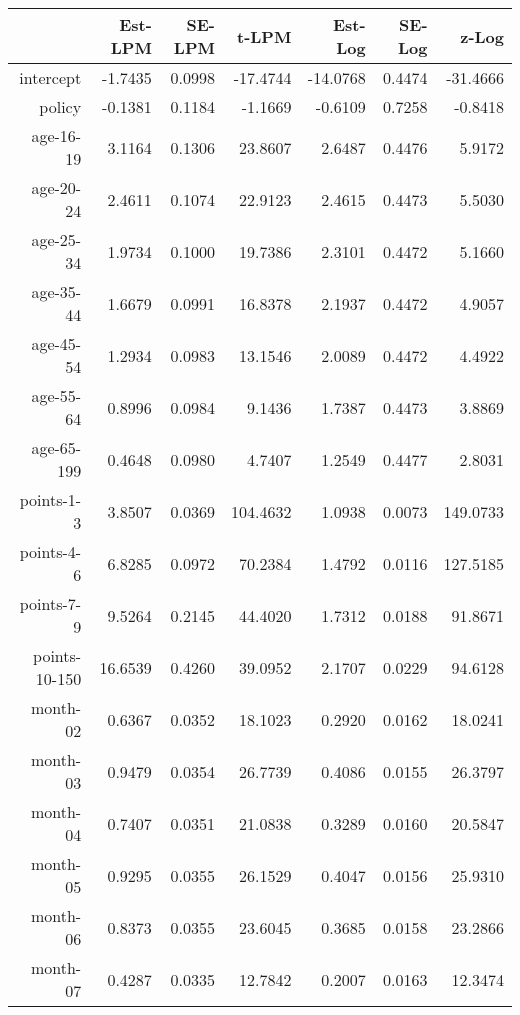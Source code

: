 \documentclass[10pt]{article}
\begin{document}
\clearpage
\pagebreak




\begin{table}[ht]
\centering
\begin{tabular}{rrrrrrr}
  \hline
 & Est-LPM & SE-LPM & t-LPM & Est-Log & SE-Log & z-Log \\ 
  \hline
intercept & -1.7435 & 0.0998 & -17.4744 & -14.0768 & 0.4474 & -31.4666 \\ 
  policy & -0.1381 & 0.1184 & -1.1669 & -0.6109 & 0.7258 & -0.8418 \\ 
  age-16-19 & 3.1164 & 0.1306 & 23.8607 & 2.6487 & 0.4476 & 5.9172 \\ 
  age-20-24 & 2.4611 & 0.1074 & 22.9123 & 2.4615 & 0.4473 & 5.5030 \\ 
  age-25-34 & 1.9734 & 0.1000 & 19.7386 & 2.3101 & 0.4472 & 5.1660 \\ 
  age-35-44 & 1.6679 & 0.0991 & 16.8378 & 2.1937 & 0.4472 & 4.9057 \\ 
  age-45-54 & 1.2934 & 0.0983 & 13.1546 & 2.0089 & 0.4472 & 4.4922 \\ 
  age-55-64 & 0.8996 & 0.0984 & 9.1436 & 1.7387 & 0.4473 & 3.8869 \\ 
  age-65-199 & 0.4648 & 0.0980 & 4.7407 & 1.2549 & 0.4477 & 2.8031 \\ 
  points-1-3 & 3.8507 & 0.0369 & 104.4632 & 1.0938 & 0.0073 & 149.0733 \\ 
  points-4-6 & 6.8285 & 0.0972 & 70.2384 & 1.4792 & 0.0116 & 127.5185 \\ 
  points-7-9 & 9.5264 & 0.2145 & 44.4020 & 1.7312 & 0.0188 & 91.8671 \\ 
  points-10-150 & 16.6539 & 0.4260 & 39.0952 & 2.1707 & 0.0229 & 94.6128 \\ 
  month-02 & 0.6367 & 0.0352 & 18.1023 & 0.2920 & 0.0162 & 18.0241 \\ 
  month-03 & 0.9479 & 0.0354 & 26.7739 & 0.4086 & 0.0155 & 26.3797 \\ 
  month-04 & 0.7407 & 0.0351 & 21.0838 & 0.3289 & 0.0160 & 20.5847 \\ 
  month-05 & 0.9295 & 0.0355 & 26.1529 & 0.4047 & 0.0156 & 25.9310 \\ 
  month-06 & 0.8373 & 0.0355 & 23.6045 & 0.3685 & 0.0158 & 23.2866 \\ 
  month-07 & 0.4287 & 0.0335 & 12.7842 & 0.2007 & 0.0163 & 12.3474 \\ 

\end{tabular}
\end{table}
\end{document}
